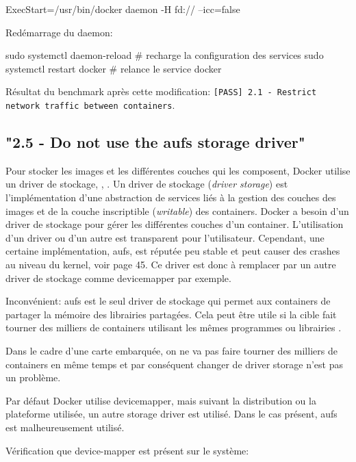 \documentclass[11pt,a4paper,oneside]{report}
\newcommand{\code}[1]{\texttt{#1}}
\begin{document}
\begin{bashcode}
ExecStart=/usr/bin/docker daemon -H fd:// --icc=false
\end{bashcode}

Redémarrage du daemon:

\begin{bashcode}
sudo systemctl daemon-reload # recharge la configuration des services
sudo systemctl restart docker # relance le service docker
\end{bashcode}

Résultat du benchmark après cette modification: \code{[PASS] 2.1 - Restrict network traffic between containers}.

\subsection{"2.5 - Do not use the aufs storage driver"}
Pour stocker les images et les différentes couches qui les composent, Docker utilise un driver de stockage\cite{understanding_image_container_driver_storage}, \cite{docker_select_a_driver}, \cite{jpetazzoni_device_driver}. Un driver de stockage (\textit{driver storage}) est l'implémentation d'une abstraction de services liés à la gestion des couches des images et de la couche inscriptible (\textit{writable}) des containers. Docker a besoin d'un driver de stockage pour gérer les différentes couches d'un container. L'utilisation d'un driver ou d'un autre est transparent pour l'utilisateur. Cependant, une certaine implémentation, aufs, est réputée peu stable et peut causer des crashes au niveau du kernel, voir \cite{cis_benchmark} page 45. Ce driver est donc à remplacer par un autre driver de stockage comme devicemapper par exemple.

Inconvénient: aufs est le seul driver de stockage qui permet aux containers de partager la mémoire des librairies partagées. Cela peut être utile si la cible fait tourner des milliers de containers utilisant les mêmes programmes ou librairies \cite{cis_benchmark}.

Dans le cadre d'une carte embarquée, on ne va pas faire tourner des milliers de containers en même temps et par conséquent changer de driver storage n'est pas un problème.

Par défaut Docker utilise devicemapper, mais suivant la distribution ou la plateforme utilisée, un autre storage driver est utilisé. Dans le cas présent, aufs est malheureusement utilisé.

Vérification que device-mapper est présent sur le système:
\end{document}
